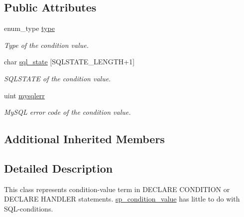 \subsection*{Public Attributes}
\begin{DoxyCompactItemize}
\item 
\mbox{\label{classsp__condition__value_aba7838d59b7277fc23e19d091cf3ff1f}} 
enum\+\_\+type \mbox{\hyperlink{classsp__condition__value_aba7838d59b7277fc23e19d091cf3ff1f}{type}}
\begin{DoxyCompactList}\small\item\em Type of the condition value. \end{DoxyCompactList}\item 
\mbox{\label{classsp__condition__value_a5aad50e31732a61178804ac84ef40449}} 
char \mbox{\hyperlink{classsp__condition__value_a5aad50e31732a61178804ac84ef40449}{sql\+\_\+state}} \mbox{[}S\+Q\+L\+S\+T\+A\+T\+E\+\_\+\+L\+E\+N\+G\+TH+1\mbox{]}
\begin{DoxyCompactList}\small\item\em S\+Q\+L\+S\+T\+A\+TE of the condition value. \end{DoxyCompactList}\item 
\mbox{\label{classsp__condition__value_a8bd587adf0922caf55d1a5ee74e570cd}} 
uint \mbox{\hyperlink{classsp__condition__value_a8bd587adf0922caf55d1a5ee74e570cd}{mysqlerr}}
\begin{DoxyCompactList}\small\item\em My\+S\+QL error code of the condition value. \end{DoxyCompactList}\end{DoxyCompactItemize}
\subsection*{Additional Inherited Members}


\subsection{Detailed Description}
This class represents condition-\/value term in D\+E\+C\+L\+A\+RE C\+O\+N\+D\+I\+T\+I\+ON or D\+E\+C\+L\+A\+RE H\+A\+N\+D\+L\+ER statements. \mbox{\hyperlink{classsp__condition__value}{sp\+\_\+condition\+\_\+value}} has little to do with S\+QL-\/conditions.

